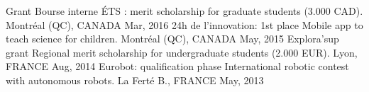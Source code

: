 


\begin{cvhonors}
\cvhonor
{Grant} %
{Bourse interne ÉTS : merit scholarship for graduate students (3.000 CAD).} %
{\hspace{-5mm}Montréal (QC), CANADA} %
{Mar, 2016} %
\cvhonor
{24h de l'innovation: 1st place} %
{Mobile app to teach science for children.} %
{\hspace{-5mm}Montréal (QC), CANADA} %
{May, 2015} %
\cvhonor
{Explora'sup grant} %
{Regional merit scholarship for undergraduate students (2.000 EUR).} %
{Lyon, FRANCE} %
{Aug, 2014} %
\cvhonor
{Eurobot: qualification phase} %
{International robotic contest with autonomous robots.} %
{La Ferté B., FRANCE} %
{May, 2013} %
\end{cvhonors}
